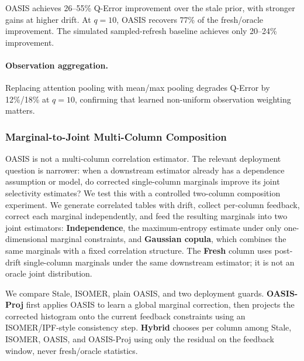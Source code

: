 \documentclass[runningheads]{llncs}
\begin{document}
OASIS achieves 26--55\% Q-Error improvement over the stale prior, with stronger gains at higher drift. At $q{=}10$, OASIS recovers 77\% of the fresh/oracle improvement. The simulated sampled-refresh baseline achieves only 20--24\% improvement.

\paragraph{Observation aggregation.}
Replacing attention pooling with mean/max pooling degrades Q-Error by 12\%/18\% at $q{=}10$, confirming that learned non-uniform observation weighting matters.

\subsubsection{Marginal-to-Joint Multi-Column Composition}
\label{sec:marginal_joint}

OASIS is not a multi-column correlation estimator. The relevant deployment question is narrower: when a downstream estimator already has a dependence assumption or model, do corrected single-column marginals improve its joint selectivity estimates? We test this with a controlled two-column composition experiment. We generate correlated tables with drift, collect per-column feedback, correct each marginal independently, and feed the resulting marginals into two joint estimators: \textbf{Independence}, the maximum-entropy estimate under only one-dimensional marginal constraints, and \textbf{Gaussian copula}, which combines the same marginals with a fixed correlation structure. The \textbf{Fresh} column uses post-drift single-column marginals under the same downstream estimator; it is not an oracle joint distribution.

We compare Stale, ISOMER, plain OASIS, and two deployment guards. \textbf{OASIS-Proj} first applies OASIS to learn a global marginal correction, then projects the corrected histogram onto the current feedback constraints using an ISOMER/IPF-style consistency step. \textbf{Hybrid} chooses per column among Stale, ISOMER, OASIS, and OASIS-Proj using only the residual on the feedback window, never fresh/oracle statistics.
\end{document}
